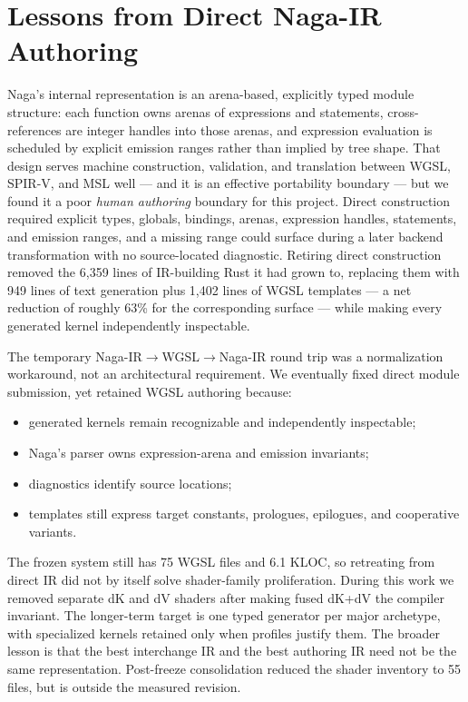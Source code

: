\documentclass[10pt,twocolumn]{article}
\begin{document}
\section{Lessons from Direct Naga-IR Authoring}
\label{sec:naga}

Naga's internal representation is an arena-based, explicitly typed module
structure: each function owns arenas of expressions and statements,
cross-references are integer handles into those arenas, and expression
evaluation is scheduled by explicit emission ranges rather than implied by
tree shape. That design serves machine construction, validation, and
translation between WGSL, SPIR-V, and MSL well --- and it is an effective
portability boundary --- but we found it a poor \emph{human authoring}
boundary for this project. Direct construction required explicit types,
globals, bindings, arenas, expression handles, statements, and emission
ranges, and a missing range could surface during a later backend
transformation with no source-located diagnostic. Retiring direct
construction removed the 6,359 lines of IR-building Rust it had grown to,
replacing them with 949 lines of text generation plus 1,402 lines of WGSL
templates --- a net reduction of roughly 63\% for the corresponding
surface --- while making every generated kernel independently inspectable.

The temporary Naga-IR$\rightarrow$WGSL$\rightarrow$Naga-IR round trip was a
normalization workaround, not an architectural requirement. We eventually
fixed direct module submission, yet retained WGSL authoring because:
\begin{itemize}
  \item generated kernels remain recognizable and independently inspectable;
  \item Naga's parser owns expression-arena and emission invariants;
  \item diagnostics identify source locations;
  \item templates still express target constants, prologues, epilogues, and
        cooperative variants.
\end{itemize}

The frozen system still has 75 WGSL files and 6.1 KLOC, so retreating from
direct IR did not by itself solve shader-family proliferation. During this work we
removed separate dK and dV shaders after making fused dK+dV the compiler
invariant. The longer-term target is one typed generator per major archetype,
with specialized kernels retained only when profiles justify them. The
broader lesson is that the best interchange IR and the best authoring IR need
not be the same representation. Post-freeze consolidation reduced the shader
inventory to 55 files, but is outside the measured revision.
\end{document}
